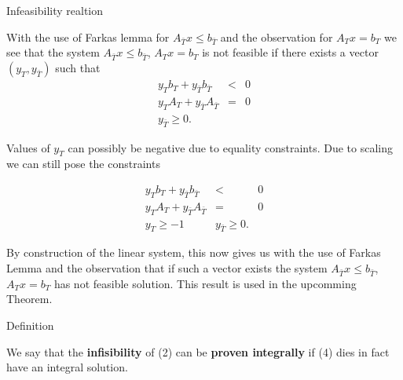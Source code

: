 \documentclass{beamer}
\begin{document}
\begin{frame}

	\begin{block}{Infeasibility realtion}

		With the use of Farkas lemma for $A_{\bar{T}} x \leq b_{\bar{T}}$ and the observation for $A_T x = b_T$ we see that the system $A_{\bar{T}} x \leq b_{\bar{T}}$, $A_T x = b_T$ is not feasible if there exists a vector $(y_T, y_{\bar{T}})$ such that\\

		\begin{eqnarray*}
			y_T b_T + y_{\bar{T}} b_{\bar{T}} & < & 0 \\
			y_T A_T + y_{\bar{T}} A_{\bar{T}} & = & 0 \\
			y_{\bar{T}} \geq 0.
		\end{eqnarray*}

	\end{block}

\end{frame}

\begin{frame}

	\begin{block}

		Values of $y_T$ can possibly be negative due to equality constraints. Due to scaling we can still pose the constraints

		\begin{eqnarray*}
			y_T b_T + y_{\bar{T}} b_{\bar{T}} & < & 0 \\
			y_T A_T + y_{\bar{T}} A_{\bar{T}} & = & 0 \\
			y_T \geq -1 & y_{\bar{T}} \geq 0.
		\end{eqnarray*}

		By construction of the linear system, this now gives us with the use of Farkas Lemma and the observation that if such a vector exists the system $A_{\bar{T}} x \leq b_{\bar{T}}$, $A_T x = b_T$ has not feasible solution. This result is used in the upcomming Theorem.

	\end{block}

\end{frame}

\begin{frame}

	\begin{block}{Definition}

		We say that the \textbf{infisibility} of (2) can be \textbf{proven integrally} if (4) dies in fact have an integral solution. 

	\end{block}

\end{frame}
\end{document}
